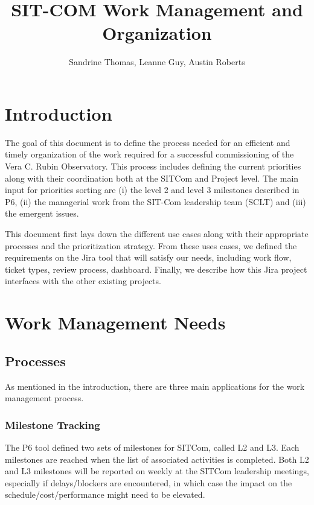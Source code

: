 \documentclass[SE,authoryear,toc]{lsstdoc}
\title{SIT-COM Work Management and Organization}
\author{%
Sandrine Thomas, Leanne Guy, Austin Roberts
}
\begin{document}
\maketitle

\section{Introduction}
The goal of this document is to define the process needed for an efficient and timely organization of the work required for a successful commissioning of the Vera C. Rubin Observatory. 
This process includes defining the current priorities along with their coordination both at the SITCom and Project level. 
The main input for priorities sorting are (i) the level 2 and level 3 milestones described in P6, (ii) the managerial work from the SIT-Com leadership team (SCLT) and (iii) the emergent issues.

This document first lays down the different use cases along with their appropriate processes and the prioritization strategy. From these uses cases, we defined the requirements on the Jira tool that will satisfy our needs, including work flow, ticket types, review process, dashboard. Finally, we describe how this Jira project interfaces with the other existing projects. 

\section{Work Management Needs}
\subsection{Processes}
As mentioned in the introduction, there are three main applications for the work management process. 
\subsubsection{Milestone Tracking}
The P6 tool defined two sets of milestones for SITCom, called L2 and L3. Each milestones are reached when the list of associated activities is completed. Both L2 and L3 milestones will be reported on weekly at the SITCom leadership meetings, especially if delays/blockers are encountered, in which case the impact on the schedule/cost/performance might need to be elevated.
\end{document}

